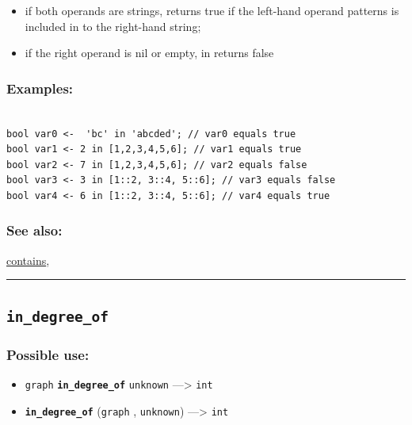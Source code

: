 \documentclass[]{book}
\providecommand{\tightlist}{%
  \setlength{\itemsep}{0pt}\setlength{\parskip}{0pt}}
\theoremstyle{definition}
\theoremstyle{definition}
\theoremstyle{definition}
\theoremstyle{remark}
\begin{document}
\begin{itemize}
\tightlist
\item
  if both operands are strings, returns true if the left-hand operand
  patterns is included in to the right-hand string;\\
\item
  if the right operand is nil or empty, in returns false
\end{itemize}

\subsubsection{Examples:}\label{examples-204}

\begin{verbatim}
 
bool var0 <-  'bc' in 'abcded'; // var0 equals true 
bool var1 <- 2 in [1,2,3,4,5,6]; // var1 equals true 
bool var2 <- 7 in [1,2,3,4,5,6]; // var2 equals false 
bool var3 <- 3 in [1::2, 3::4, 5::6]; // var3 equals false 
bool var4 <- 6 in [1::2, 3::4, 5::6]; // var4 equals true
\end{verbatim}

\subsubsection{See also:}\label{see-also-114}

\href{operators-b-to-c.html\#contains}{contains},

\begin{center}\rule{0.5\linewidth}{\linethickness}\end{center}

\subsection{\texorpdfstring{\texttt{in\_degree\_of}}{in\_degree\_of}}\label{in_degree_of}

\subsubsection{Possible use:}\label{possible-use-267}

\begin{itemize}
\tightlist
\item
  \texttt{graph} \textbf{\texttt{in\_degree\_of}} \texttt{unknown}
  ---\textgreater{} \texttt{int}
\item
  \textbf{\texttt{in\_degree\_of}} (\texttt{graph} , \texttt{unknown})
  ---\textgreater{} \texttt{int}
\end{itemize}
\end{document}
